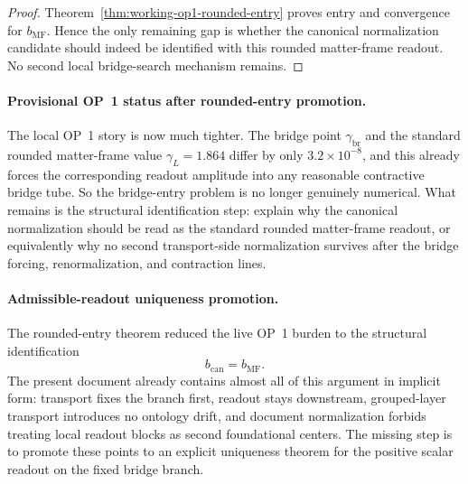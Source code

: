 \begin{proof}
Theorem~\ref{thm:working-op1-rounded-entry} proves entry and convergence for \(b_{\mathrm{MF}}\). Hence the only remaining gap is whether the canonical normalization candidate should indeed be identified with this rounded matter-frame readout. No second local bridge-search mechanism remains.
\end{proof}

\paragraph{Provisional OP~1 status after rounded-entry promotion.}
The local OP~1 story is now much tighter. The bridge point \(\gamma_{\mathrm{br}}\) and the standard rounded matter-frame value \(\gamma_L=1.864\) differ by only \(3.2\times 10^{-8}\), and this already forces the corresponding readout amplitude into any reasonable contractive bridge tube. So the bridge-entry problem is no longer genuinely numerical. What remains is the structural identification step: explain why the canonical normalization should be read as the standard rounded matter-frame readout, or equivalently why no second transport-side normalization survives after the bridge forcing, renormalization, and contraction lines.


\paragraph{Admissible-readout uniqueness promotion.}
The rounded-entry theorem reduced the live OP~1 burden to the structural identification
\[
  b_{\mathrm{can}}=b_{\mathrm{MF}}.
\]
The present document already contains almost all of this argument in implicit form: transport fixes the branch first, readout stays downstream, grouped-layer transport introduces no ontology drift, and document normalization forbids treating local readout blocks as second foundational centers. The missing step is to promote these points to an explicit uniqueness theorem for the positive scalar readout on the fixed bridge branch.

